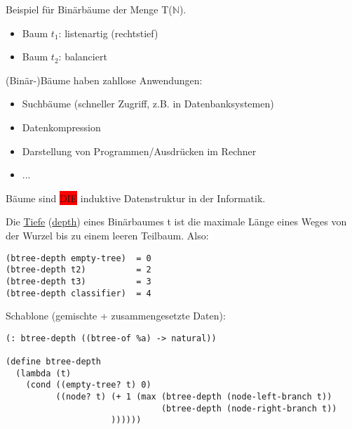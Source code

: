 \documentclass[a4paper,12pt]{article}
\begin{document}
Beispiel für Binärbäume der Menge T($\mathbb{N}$).
\begin{itemize}
\item Baum $t_1$: listenartig (rechtstief)

\item Baum $t_2$: balanciert

\end{itemize}
(Binär-)Bäume haben zahllose Anwendungen:
\begin{itemize}
\item Suchbäume (schneller Zugriff, z.B. in Datenbanksystemen)
\item Datenkompression
\item Darstellung von Programmen/Ausdrücken im Rechner
\item ...
\end{itemize}
Bäume sind \colorbox{red}{DIE} induktive Datenstruktur in der Informatik.

Die \uline{Tiefe} (\uline{depth}) eines Binärbaumes t ist die maximale Länge eines Weges von der Wurzel bis zu einem leeren Teilbaum. Also: 
\begin{lstlisting}
(btree-depth empty-tree)  = 0
(btree-depth t2)          = 2
(btree-depth t3)          = 3
(btree-depth classifier)  = 4
\end{lstlisting}

Schablone (gemischte + zusammengesetzte Daten):
\begin{lstlisting}[style=customc]
(: btree-depth ((btree-of %a) -> natural))

(define btree-depth
  (lambda (t)
    (cond ((empty-tree? t) 0)
          ((node? t) (+ 1 (max (btree-depth (node-left-branch t))
                               (btree-depth (node-right-branch t))
                     ))))))
\end{lstlisting}
\end{document}
